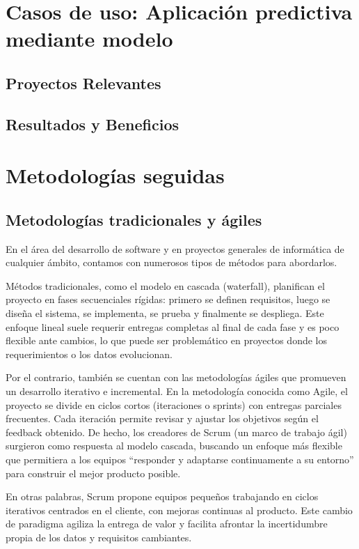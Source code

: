 \documentclass[a4paper,11pt]{book}
\begin{document}
\section{Casos de uso: Aplicación predictiva mediante modelo}

\subsection{Proyectos Relevantes}
\subsection{Resultados y Beneficios}


\section{Metodologías seguidas}
\subsection{Metodologías tradicionales y ágiles}
En el área del desarrollo de software y en proyectos generales de informática de cualquier ámbito, contamos con numerosos tipos de métodos para abordarlos.

Métodos tradicionales, como el modelo en cascada (waterfall), planifican el proyecto en fases secuenciales rígidas: primero se definen requisitos, luego se diseña el sistema, se implementa, se prueba y finalmente se despliega. Este enfoque lineal suele requerir entregas completas al final de cada fase y es poco flexible ante cambios, lo que puede ser problemático en proyectos donde los requerimientos o los datos evolucionan. 

Por el contrario, también se cuentan con  las metodologías ágiles que promueven un desarrollo iterativo e incremental. En la metodología conocida como Agile, el proyecto se divide en ciclos cortos (iteraciones o sprints) con entregas parciales frecuentes. Cada iteración permite revisar y ajustar los objetivos según el feedback obtenido. De hecho, los creadores de Scrum (un marco de trabajo ágil) surgieron como respuesta al modelo cascada, buscando un enfoque más flexible que permitiera a los equipos “responder y adaptarse continuamente a su entorno” para construir el mejor producto posible. 

En otras palabras, Scrum propone equipos pequeños trabajando en ciclos iterativos centrados en el cliente, con mejoras continuas al producto. Este cambio de paradigma agiliza la entrega de valor y facilita afrontar la incertidumbre propia de los datos y requisitos cambiantes.
\end{document}
